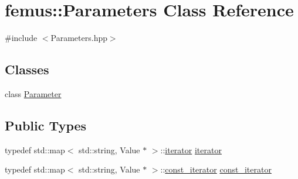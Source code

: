 \hypertarget{classfemus_1_1_parameters}{}\section{femus\+:\+:Parameters Class Reference}
\label{classfemus_1_1_parameters}


{\ttfamily \#include $<$Parameters.\+hpp$>$}

\subsection*{Classes}
\begin{DoxyCompactItemize}
\item 
class \mbox{\hyperlink{classfemus_1_1_parameters_1_1_parameter}{Parameter}}
\end{DoxyCompactItemize}
\subsection*{Public Types}
\begin{DoxyCompactItemize}
\item 
typedef std\+::map$<$ std\+::string, Value $\ast$ $>$\+::\mbox{\hyperlink{classfemus_1_1_parameters_a2cbdfdaaa2d9438d9a6900aa62c8295b}{iterator}} \mbox{\hyperlink{classfemus_1_1_parameters_a2cbdfdaaa2d9438d9a6900aa62c8295b}{iterator}}
\item 
typedef std\+::map$<$ std\+::string, Value $\ast$ $>$\+::\mbox{\hyperlink{classfemus_1_1_parameters_aa561fb692a63fe58dcec20374e9569c2}{const\+\_\+iterator}} \mbox{\hyperlink{classfemus_1_1_parameters_aa561fb692a63fe58dcec20374e9569c2}{const\+\_\+iterator}}
\end{DoxyCompactItemize}
